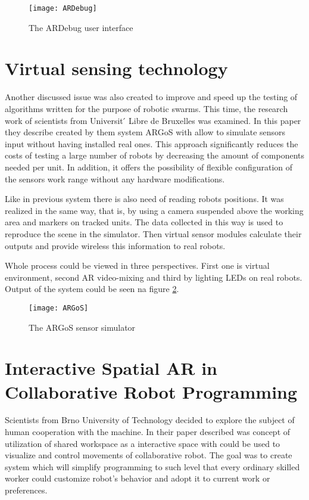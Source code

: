 \documentclass[printmode,en]{mgr}
\begin{document}
\begin{figure}[!ht]
  \centering
    \texttt{[image: ARDebug]}
  \caption{The ARDebug user interface \cite{ARDebug}}
  \label{fig:ARDebug}
\end{figure}

\section{Virtual sensing technology}
Another discussed issue was also created to improve and speed up the testing of algorithms written for the purpose of robotic swarms. This time, the research work \cite{ARGoS} of scientists from Universit ́ Libre de Bruxelles was examined. In this paper they describe created by them system ARGoS with allow to simulate sensors input without having installed real ones. This approach significantly reduces the costs of testing a large number of robots by decreasing the amount of components needed per unit. In addition, it offers the possibility of flexible configuration of the sensors work range without any hardware modifications.

Like in previous system there is also need of reading robots positions. It was realized in the same way, that is, by using a camera suspended above the working area and markers on tracked units. The data collected in this way is used to reproduce the scene in the simulator. Then virtual sensor modules calculate their outputs and provide wireless this information to real robots.

Whole process could be viewed in three perspectives. First one is virtual environment, second AR video-mixing and third by lighting LEDs on real robots. Output of the system could be seen na figure \ref{fig:ARGoS}.

\begin{figure}[!ht]
  \centering
    \texttt{[image: ARGoS]}
  \caption{The ARGoS sensor simulator \cite{ARGoS}}
  \label{fig:ARGoS}
\end{figure}

\section{Interactive Spatial AR in Collaborative Robot Programming}
Scientists from Brno University of Technology decided to explore the subject of human cooperation with the machine. In their paper \cite{SpatialARCollaborative} described was concept of utilization of shared workspace as a interactive space with could be used to visualize and control movements of collaborative robot. The goal was to create system which will simplify programming to such level that every ordinary skilled worker could customize robot's behavior and adopt it to current work or preferences.
\end{document}
